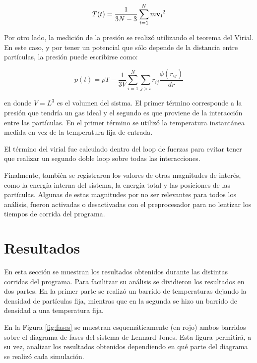 \documentclass[a4paper,12pt]{article}
\begin{document}
\begin{equation}\label{eq:tempe}
 T(t) = \frac{1}{3N-3} \sum_{i=1}^{N} m {\bf v_i}^2
\end{equation}

Por otro lado, la medición de la presión se realizó utilizando el teorema del 
Virial. En este caso, y por tener un potencial que sólo depende de la distancia 
entre partículas, la presión puede escribirse como:

\begin{equation}\label{eq:pres}
p(t) = \rho T  - \frac{1}{3V} \sum_{i=1}^N \sum_{j>i} r_{ij} \frac{\phi(r_{ij})}{dr}
\end{equation}

\noindent en donde $V=L^3$ es el volumen del sistma. El primer término 
corresponde a la presión que tendría un gas ideal y el segundo es que proviene 
de la interacción entre las partículas. En el primer término se utilizó la 
temperatura instantánea medida en vez de la temperatura fija de entrada.

El término del virial fue calculado dentro del loop de fuerzas para evitar 
tener que realizar un segundo doble loop sobre todas las interacciones.

Finalmente, también se registraron los valores de otras magnitudes de interés, 
como la energía interna del sistema, la energía total y las posiciones de las 
partículas. Algunas de estas magnitudes por no ser relevantes para todos los 
análisis, fueron activadas o desactivadas con el preprocesador para no lentizar 
los tiempos de corrida del programa.

\section{Resultados}

En esta sección se muestran los resultados obtenidos durante las distintas 
corridas del programa. Para facilitzar su análisis se dividieron los resultados 
en dos partes. En la primer parte se realizó un barrido de temperaturas 
dejando la densidad de partículas fija, mientras que en la segunda se hizo un 
barrido de densidad a una temperatura fija.

En la Figura \eqref{fig:fases} se muestran esquemáticamente (en rojo) ambos 
barridos sobre el diagrama de fases del sistema de Lennard-Jones. Esta figura 
permitirá, a su vez, analizar los resultados obtenidos dependiendo en qué parte 
del diagrama se realizó cada simulación.
\end{document}
